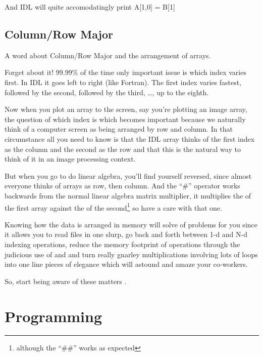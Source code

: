 

  And IDL will quite accomodatingly print A[1,0] = B[1]



\subsection{Column/Row Major}\label{sec:qs-Column-Row}

  A word about Column/Row Major and the arrangement of arrays.

   Forget about it! 99.99\% of the time only important issue is which
  index varies first. In IDL it goes left to right (like Fortran). The
  first index varies fastest, followed by the second, followed by the
  third, \ldots , up to the eighth.

   Now when you plot an array to the screen, say you're plotting an
   image array, the question of which index is which becomes important
   because we naturally think of a computer screen as being arranged
   by row and column. In that circumstance all you need to know is
   that the IDL array thinks of the first index as the column and the
   second as the row and that this is the natural way to think of it
   in an image processing context.

   But when you go to do linear algebra, you'll find yourself
   reversed, since almost everyone thinks of arrays as row, then
   column. And the ``\#'' operator works backwards from the normal
   linear algebra matrix multiplier, it multiplies the  of the
   first array against the  of the second\footnote{although the
   ``\#\#'' works as expected} so have a care with that one.

   Knowing how the data is arranged in memory will solve  of
   problems for you since it allows you to read files in one slurp, go
   back and forth between 1-d and N-d indexing operations, reduce the
   memory footprint of operations through the judicious use of
    and
    and turn really
   gnarley multiplications involving lots of loops into one line pieces
   of elegance which will astound and amaze your co-workers.

   So, start being aware of these matters .

\section{Programming}\label{sec:qs-Programming}

